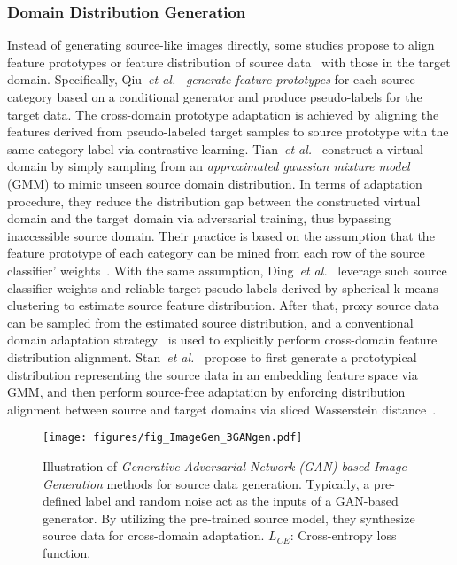 \documentclass[10pt,journal,compsoc]{IEEEtran}
\def\etal{{\em et al.}}
\begin{document}
\subsubsection{Domain Distribution Generation}\label{sec_domain_distribution_generation}
Instead of generating source-like images directly, some studies propose to align feature prototypes or feature distribution of source data~\cite{qiu2021source, tian2021vdm, ding2022source, stan2021unsupervised, stan2021privacy} with those in the target domain.
Specifically, Qiu~\etal~\cite{qiu2021source} \emph{generate feature prototypes} for each source category based on a conditional generator and produce pseudo-labels for the target data. %
The cross-domain prototype adaptation is achieved by aligning the features derived from pseudo-labeled target samples to source prototype with the same category label via contrastive learning.
Tian~\etal~\cite{tian2021vdm} construct a virtual domain by simply sampling from an \emph{approximated gaussian mixture model} (GMM) to mimic unseen source domain distribution.
In terms of adaptation procedure, they reduce the distribution gap between the constructed virtual domain and the target domain via adversarial training, thus bypassing inaccessible source domain.
Their practice is based on the assumption that the feature prototype of each category can be mined from each row of the source classifier' weights~\cite{chen2019closer}.
With the same assumption, Ding~\etal~\cite{ding2022source} leverage such source classifier weights and reliable target pseudo-labels derived by spherical k-means clustering to estimate source feature distribution.
After that, proxy source data can be sampled from the estimated source distribution, and a conventional domain adaptation strategy~\cite{kang2019contrastive} is used to explicitly perform cross-domain feature distribution alignment.
Stan~\etal~\cite{stan2021unsupervised, stan2021privacy} propose to first generate a prototypical distribution representing the source data in an embedding feature space via GMM, and then perform source-free adaptation by enforcing distribution alignment between source and target domains via sliced Wasserstein distance~\cite{lee2019sliced}.


\begin{figure}[!t]
\setlength{\abovecaptionskip}{0pt}
\setlength{\belowcaptionskip}{-2pt}
\setlength{\abovedisplayskip}{-2pt}
\setlength{\belowdisplayskip}{-2pt}
	\centering
	\texttt{[image: figures/fig\_ImageGen\_3GANgen.pdf]}
	\caption{
	Illustration of \emph{Generative Adversarial
Network (GAN) based Image Generation} methods for source data generation.
	Typically, a pre-defined label and random noise act as the inputs of a GAN-based generator.
	By utilizing the pre-trained source model, they synthesize source data for cross-domain adaptation.
	$L_{CE}$: Cross-entropy loss function.}
	\label{fig_ImageGen_3GANgen}
\end{figure}
\end{document}
